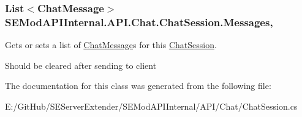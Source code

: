 \hypertarget{class_s_e_mod_a_p_i_internal_1_1_a_p_i_1_1_chat_1_1_chat_session_afaadec33e11a84223a04243681d90dea}{}
\subsubsection[{Messages}]{\setlength{\rightskip}{0pt plus 5cm}List$<${\bf Chat\+Message}$>$ S\+E\+Mod\+A\+P\+I\+Internal.\+A\+P\+I.\+Chat.\+Chat\+Session.\+Messages\hspace{0.3cm}{\ttfamily [get]}, {\ttfamily [set]}}\label{class_s_e_mod_a_p_i_internal_1_1_a_p_i_1_1_chat_1_1_chat_session_afaadec33e11a84223a04243681d90dea}


Gets or sets a list of \hyperlink{class_s_e_mod_a_p_i_internal_1_1_a_p_i_1_1_chat_1_1_chat_message}{Chat\+Message}s for this \hyperlink{class_s_e_mod_a_p_i_internal_1_1_a_p_i_1_1_chat_1_1_chat_session}{Chat\+Session}. 

Should be cleared after sending to client

The documentation for this class was generated from the following file\+:\begin{DoxyCompactItemize}
\item 
E\+:/\+Git\+Hub/\+S\+E\+Server\+Extender/\+S\+E\+Mod\+A\+P\+I\+Internal/\+A\+P\+I/\+Chat/Chat\+Session.\+cs\end{DoxyCompactItemize}
